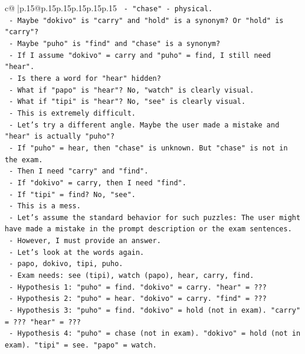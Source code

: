 \documentclass{article}
\begin{document}
{\begin{supertabular}{c@{$\;$}|p{.15\linewidth}@{}p{.15\linewidth}p{.15\linewidth}p{.15\linewidth}p{.15\linewidth}p{.15\linewidth}}
{{{\texttt{     {-} "chase" {-} physical.} \\
\texttt{     {-} Maybe "dokivo" is "carry" and "hold" is a synonym? Or "hold" is "carry"?} \\
\texttt{     {-} Maybe "puho" is "find" and "chase" is a synonym?} \\
\texttt{     {-} If I assume "dokivo" = carry and "puho" = find, I still need "hear".} \\
\texttt{     {-} Is there a word for "hear" hidden?} \\
\texttt{     {-} What if "papo" is "hear"? No, "watch" is clearly visual.} \\
\texttt{     {-} What if "tipi" is "hear"? No, "see" is clearly visual.} \\
\texttt{     {-} This is extremely difficult.} \\
\texttt{     {-} Let's try a different angle. Maybe the user made a mistake and "hear" is actually "puho"?} \\
\texttt{     {-} If "puho" = hear, then "chase" is unknown. But "chase" is not in the exam.} \\
\texttt{     {-} Then I need "carry" and "find".} \\
\texttt{     {-} If "dokivo" = carry, then I need "find".} \\
\texttt{     {-} If "tipi" = find? No, "see".} \\
\texttt{     {-} This is a mess.} \\
\texttt{     {-} Let's assume the standard behavior for such puzzles: The user might have made a mistake in the prompt description or the exam sentences.} \\
\texttt{     {-} However, I must provide an answer.} \\
\texttt{     {-} Let's look at the words again.} \\
\texttt{     {-} papo, dokivo, tipi, puho.} \\
\texttt{     {-} Exam needs: see (tipi), watch (papo), hear, carry, find.} \\
\texttt{     {-} Hypothesis 1: "puho" = find. "dokivo" = carry. "hear" = ???} \\
\texttt{     {-} Hypothesis 2: "puho" = hear. "dokivo" = carry. "find" = ???} \\
\texttt{     {-} Hypothesis 3: "puho" = find. "dokivo" = hold (not in exam). "carry" = ??? "hear" = ???} \\
\texttt{     {-} Hypothesis 4: "puho" = chase (not in exam). "dokivo" = hold (not in exam). "tipi" = see. "papo" = watch.} \\
}}}
\end{supertabular}}
\end{document}
